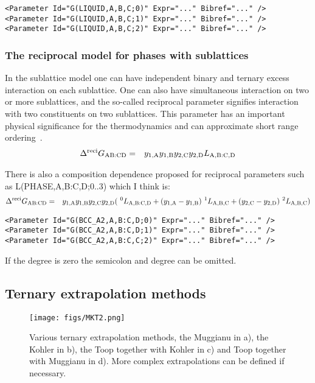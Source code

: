 \documentclass{article}
\begin{document}
\begin{appendices}
\begin{verbatim}
<Parameter Id="G(LIQUID,A,B,C;0)" Expr="..." Bibref="..." />
<Parameter Id="G(LIQUID,A,B,C;1)" Expr="..." Bibref="..." />
<Parameter Id="G(LIQUID,A,B,C;2)" Expr="..." Bibref="..." />
\end{verbatim}

\subsubsection{The reciprocal model for phases with sublattices}\label{sec:recip}

In the sublattice model one can have independent binary and ternary
excess interaction on each sublattice.  One can also have simultaneous
interaction on two or more sublattices, and the so-called reciprocal
parameter signifies interaction with two constituents on two
sublattices.  This parameter has an important physical significance
for the thermodynamics and can approximate short range
ordering~\cite{98Sun}.
\begin{eqnarray}
\Delta ^{\rm reci}G_{\rm AB:CD} &=& y_{1,\rm A} y_{1,\rm B} y_{2,\rm C} y_{2,\rm D} L_{\rm A,B:C,D}
\end{eqnarray}

There is also a composition dependence proposed for reciprocal
parameters such as L(PHASE,A,B:C,D;0..3) which I think is:
\begin{eqnarray}
\Delta  ^{\rm reci}G_{\rm AB:CD} &=& y_{1,\rm A}y_{1,\rm B}y_{2,\rm C}y_{2,\rm D} (~^0L_{\rm A,B:C,D} +  (y_{1,\rm A}-y_{1,\rm B})~^1L_{\rm A,B,C} + (y_{2,\rm C}-y_{2,\rm D})~^2L_{\rm A,B,C})  \label{eq:hillert4}
\end{eqnarray}

\begin{verbatim}
<Parameter Id="G(BCC_A2,A,B:C,D;0)" Expr="..." Bibref="..." />
<Parameter Id="G(BCC_A2,A,B:C,D;1)" Expr="..." Bibref="..." />
<Parameter Id="G(BCC_A2,A,B:C,C;2)" Expr="..." Bibref="..." />
\end{verbatim}

If the degree is zero the semicolon and degree can be omitted.

\subsection{Ternary extrapolation methods}\label{sec:ternaryxpol}

\begin{figure}[!h]
  \texttt{[image: figs/MKT2.png]}
  \caption{Various ternary extrapolation methods, the Muggianu in a),
    the Kohler in b), the Toop together with Kohler in c) and Toop
    together with Muggianu in d).  More complex extrapolations can be
    defined if necessary.}\label{fg:MKT2}
\end{figure}


\end{appendices}
\end{document}
